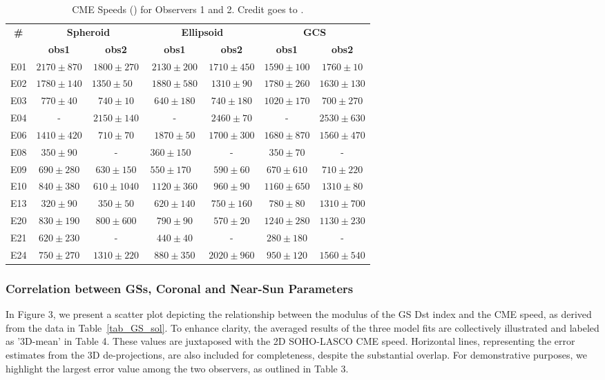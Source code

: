 \begin{table}[htp]
	\caption{CME Speeds (\kms) for Observers 1 and 2. Credit goes to \citet{miteva_2023}.}
	\label{tab_fits}
	\centering
	\begin{tabular}{ccccccc}
		\toprule
		\textbf{\#} & \multicolumn{2}{c}{\textbf{Spheroid}} & \multicolumn{2}{c}{\textbf{Ellipsoid}} & \multicolumn{2}{c}{\textbf{GCS}} \\
		& \textbf{obs1} & \textbf{obs2} & \textbf{obs1} & \textbf{obs2} & \textbf{obs1} & \textbf{obs2} \\
		\midrule
		E01 & $2170\pm870$ & $1800\pm270$ & $2130\pm200$ & $1710\pm450$ & $1590\pm100$ & $1760\pm10$ \\
		E02 & $1780\pm140$ & $1350\pm50$  & $1880\pm580$ & $1310\pm90$ & $1780\pm260$ & $1630\pm130$ \\
		E03 & $770\pm40$ & $740\pm10$ & $640\pm180$ & $740\pm180$ & $1020\pm170$ & $700\pm270$ \\
		E04 & - & $2150\pm140$ & - & $2460\pm70$ & - & $2530\pm630$ \\
		E06 & $1410\pm420$ & $710\pm70$ & $1870\pm50$ & $1700\pm300$ & $1680\pm870$ & $1560\pm470$ \\
		E08 & $350\pm90$ & - & $360\pm150$  & - & $350\pm70$ & - \\
		E09 & $690\pm280$ & $630\pm150$ & $550\pm170$  & $590\pm60$ & $670\pm610$ & $710\pm220$ \\
		E10 & $840\pm380$ & $610\pm1040$ & $1120\pm360$ & $960\pm90$ & $1160\pm650$ & $1310\pm80$ \\
		E13 & $320\pm90$ & $350\pm50$ & $620\pm140$ & $750\pm160$ & $780\pm80$ & $1310\pm700$ \\
		E20 & $830\pm190$ & $800\pm600$ & $790\pm90$ & $570\pm20$ & $1240\pm280$ & $1130\pm230$ \\
		E21 & $620\pm230$ & - & $440\pm40$ & - & $280\pm180$ & - \\
		E24 & $750\pm270$ & $1310\pm220$ & $880\pm350$ & $2020\pm960$ & $950\pm120$ & $1560\pm540$ \\
		\bottomrule
	\end{tabular}
\end{table}

\subsubsection{Correlation between GSs, Coronal and Near-Sun Parameters}
In Figure 3, we present a scatter plot depicting the relationship between the modulus of the GS Dst index and the CME speed, as derived from the data in Table~\ref{tab_GS_sol}. To enhance clarity, the averaged results of the three model fits are collectively illustrated and labeled as '3D-mean' in Table 4. These values are juxtaposed with the 2D SOHO-LASCO CME speed. Horizontal lines, representing the error estimates from the 3D de-projections, are also included for completeness, despite the substantial overlap. For demonstrative purposes, we highlight the largest error value among the two observers, as outlined in Table 3.

